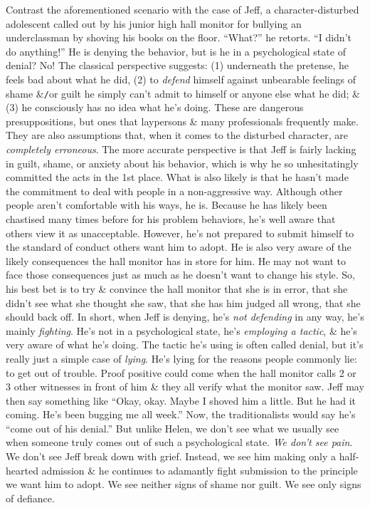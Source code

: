 \documentclass{article}
\numberwithin{equation}{section}
\begin{document}
Contrast the aforementioned scenario with the case of Jeff, a character-disturbed adolescent called out by his junior high hall monitor for bullying an underclassman by shoving his books on the floor. ``What?'' he retorts. ``I didn't do anything!'' He is denying the behavior, but is he in a psychological state of denial? No! The classical perspective suggests: (1) underneath the pretense, he feels bad about what he did, (2) to \textit{defend} himself against unbearable feelings of shame \&\texttt{/}or guilt he simply can't admit to himself or anyone else what he did; \& (3) he consciously has no idea what he's doing. These are dangerous presuppositions, but ones that laypersons \& many professionals frequently make. They are also assumptions that, when it comes to the disturbed character, are \textit{completely erroneous}. The more accurate perspective is that Jeff is fairly lacking in guilt, shame, or anxiety about his behavior, which is why he so unhesitatingly committed the acts in the 1st place. What is also likely is that he hasn't made the commitment to deal with people in a non-aggressive way. Although other people aren't comfortable with his ways, he is. Because he has likely been chastised many times before for his problem behaviors, he's well aware that others view it as unacceptable. However, he's not prepared to submit himself to the standard of conduct others want him to adopt. He is also very aware of the likely consequences the hall monitor has in store for him. He may not want to face those consequences just as much as he doesn't want to change his style. So, his best bet is to try \& convince the hall monitor that she is in error, that she didn't see what she thought she saw, that she has him judged all wrong, that she should back off. In short, when Jeff is denying, he's \textit{not defending} in any way, he's mainly \textit{fighting}. He's not in a psychological state, he's \textit{employing a tactic}, \& he's very aware of what he's doing. The tactic he's using is often called denial, but it's really just a simple case of \textit{lying}. He's lying for the reasons people commonly lie: to get out of trouble. Proof positive could come when the hall monitor calls 2 or 3 other witnesses in front of him \& they all verify what the monitor saw. Jeff may then say something like ``Okay, okay. Maybe I shoved him a little. But he had it coming. He's been bugging me all week.'' Now, the traditionalists would say he's ``come out of his denial.'' But unlike Helen, we don't see what we usually see when someone truly comes out of such a psychological state. \textit{We don't see pain}. We don't see Jeff break down with grief. Instead, we see him making only a half-hearted admission \& he continues to adamantly fight submission to the principle we want him to adopt. We see neither signs of shame nor guilt. We see only signs of defiance.
\end{document}
